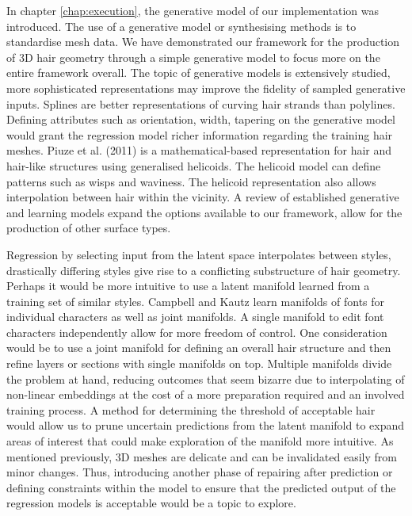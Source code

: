 \documentclass[ %
author={Dillon Keith Diep},
supervisor={Dr. Carl Henrik Ek},
degree={MEng},
title={ART-CG Hair:},
subtitle={Assisted Real-time Content Generation of Stylised Virtual Hair},
type={Research},
year={2017} ]{dissertation}
\begin{document}
In chapter \ref{chap:execution}, the generative model of our implementation was introduced. The use of a generative model or synthesising methods is to standardise mesh data. We have demonstrated our framework for the production of 3D hair geometry through a simple generative model to focus more on the entire framework overall.
The topic of generative models is extensively studied, more sophisticated representations may improve the fidelity of sampled generative inputs. Splines are better representations of curving hair strands than polylines. Defining attributes such as orientation, width, tapering on the generative model would grant the regression model richer information regarding the training hair meshes. Piuze et al. (2011) \cite{helicoidhair} is a mathematical-based representation for hair and hair-like structures using generalised helicoids. The helicoid model can define patterns such as wisps and waviness. The helicoid representation also allows interpolation between hair within the vicinity. A review of established generative and learning models expand the options available to our framework, allow for the production of other surface types.

Regression by selecting input from the latent space interpolates between styles, drastically differing styles give rise to a conflicting substructure of hair geometry. Perhaps it would be more intuitive to use a latent manifold learned from a training set of similar styles.
Campbell and Kautz \cite{fontmanifold} learn manifolds of fonts for individual characters as well as joint manifolds. A single manifold to edit font characters independently allow for more freedom of control. One consideration would be to use a joint manifold for defining an overall hair structure and then refine layers or sections with single manifolds on top. Multiple manifolds divide the problem at hand, reducing outcomes that seem bizarre due to interpolating of non-linear embeddings at the cost of a more preparation required and an involved training process.
A method for determining the threshold of acceptable hair would allow us to prune uncertain predictions from the latent manifold to expand areas of interest that could make exploration of the manifold more intuitive. 
As mentioned previously, 3D meshes are delicate and can be invalidated easily from minor changes. Thus, introducing another phase of repairing after prediction or defining constraints within the model to ensure that the predicted output of the regression models is acceptable would be a topic to explore.
\end{document}
